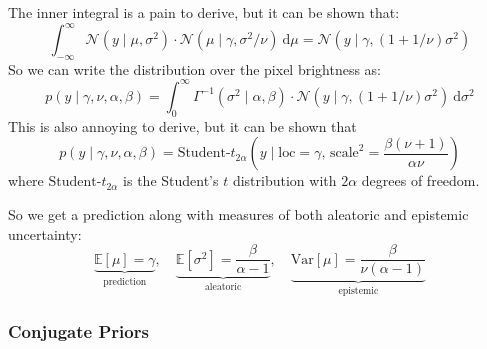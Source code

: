 \documentclass{article}
\newcommand{\f}{\frac}
\newcommand{\0}{\varnothing}
\theoremstyle{definition}
\renewcommand{\d}{\mathrm{d}}
\begin{document}
The inner integral is a pain to derive, but it can be shown that:
$$\int_{-\infty}^\infty \mathcal{N}(y \mid \mu, \sigma^2) \cdot \mathcal{N}(\mu \mid \gamma, \sigma^2/\nu)\ \d\mu = \mathcal{N}(y \mid \gamma, (1 + 1/\nu)\sigma^2)$$
So we can write the distribution over the pixel brightness as:
$$p(y \mid \gamma, \nu, \alpha, \beta) = \int_0^\infty \Gamma^{-1}(\sigma^2 \mid \alpha, \beta) \cdot \mathcal{N}(y \mid \gamma, (1 + 1/\nu)\sigma^2)\ \d\sigma^2$$
This is also annoying to derive, but it can be shown that
$$p(y \mid \gamma, \nu, \alpha, \beta) = \text{Student-}t_{2\alpha} \left( y \mid \mathrm{loc} = \gamma,\,\mathrm{scale}^2 = \f{\beta(\nu + 1)}{\alpha \nu} \right)$$
where $\text{Student-}t_{2\alpha}$ is the Student's $t$ distribution with $2\alpha$ degrees of freedom.

So we get a prediction along with measures of both aleatoric and epistemic uncertainty:
$$\underbrace{\mathbb{E}[\mu] = \gamma}_{\text{prediction}}, \quad \underbrace{\mathbb{E}[\sigma^2] = \f{\beta}{\alpha - 1}}_{\text{aleatoric}}, \quad \underbrace{\mathrm{Var}[\mu] = \f{\beta}{\nu(\alpha - 1)}}_{\text{epistemic}}$$

\subsubsection{Conjugate Priors}
\end{document}
